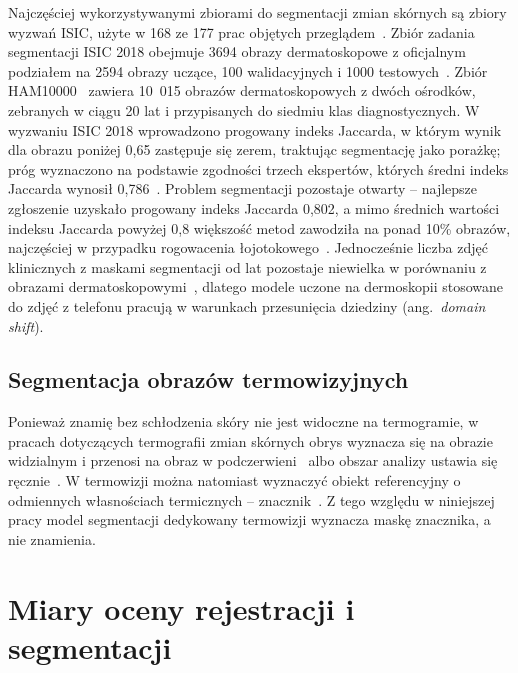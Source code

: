 Najczęściej wykorzystywanymi zbiorami do segmentacji zmian skórnych są zbiory wyzwań ISIC, użyte w 168 ze 177 prac objętych przeglądem~\cite{mirikharaji2023}. Zbiór zadania segmentacji ISIC 2018 obejmuje 3694 obrazy dermatoskopowe z oficjalnym podziałem na 2594 obrazy uczące, 100 walidacyjnych i 1000 testowych~\cite{codella2019,mirikharaji2023}. Zbiór HAM10000~\cite{tschandl2018} zawiera 10~015 obrazów dermatoskopowych z dwóch ośrodków, zebranych w ciągu 20 lat i przypisanych do siedmiu klas diagnostycznych. W wyzwaniu ISIC 2018 wprowadzono progowany indeks Jaccarda, w którym wynik dla obrazu poniżej 0,65 zastępuje się zerem, traktując segmentację jako porażkę; próg wyznaczono na podstawie zgodności trzech ekspertów, których średni indeks Jaccarda wynosił 0,786~\cite{codella2019}. Problem segmentacji pozostaje otwarty -- najlepsze zgłoszenie uzyskało progowany indeks Jaccarda 0,802, a mimo średnich wartości indeksu Jaccarda powyżej 0,8 większość metod zawodziła na ponad 10\% obrazów, najczęściej w przypadku rogowacenia łojotokowego~\cite{codella2019}. Jednocześnie liczba zdjęć klinicznych z maskami segmentacji od lat pozostaje niewielka w porównaniu z obrazami dermatoskopowymi~\cite{mirikharaji2023}, dlatego modele uczone na dermoskopii stosowane do zdjęć z telefonu pracują w warunkach przesunięcia dziedziny (ang.~\textit{domain shift}).

\subsection{Segmentacja obrazów termowizyjnych}
\label{sec:segmentacja-termo}

Ponieważ znamię bez schłodzenia skóry nie jest widoczne na termogramie, w pracach dotyczących termografii zmian skórnych obrys wyznacza się na obrazie widzialnym i przenosi na obraz w podczerwieni~\cite{visualization-detection-cancer} albo obszar analizy ustawia się ręcznie~\cite{magalhaes2019}. W termowizji można natomiast wyznaczyć obiekt referencyjny o odmiennych własnościach termicznych -- znacznik~\cite{oniga2026}. Z tego względu w niniejszej pracy model segmentacji dedykowany termowizji wyznacza maskę znacznika, a nie znamienia.

\section{Miary oceny rejestracji i segmentacji}
\label{sec:miary}

